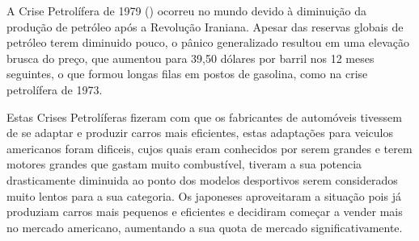 \documentclass[a4paper]{article}
\begin{document}
A Crise Petrolífera de 1979 (\cite{pet79}) ocorreu no mundo devido à diminuição da produção de petróleo após a Revolução Iraniana. 
Apesar das reservas globais de petróleo terem diminuido pouco, o pânico generalizado resultou em uma elevação brusca do preço, 
que aumentou para 39,50 dólares por barril nos 12 meses seguintes, o que formou longas filas em postos de gasolina, como na crise petrolífera de 1973.

Estas Crises Petrolíferas fizeram com que os fabricantes de automóveis tivessem de se adaptar e produzir carros mais eficientes, estas adaptações para 
veiculos americanos foram dificeis, cujos quais eram conhecidos por serem grandes e terem motores grandes que gastam muito combustível,
tiveram a sua potencia drasticamente diminuida ao ponto dos modelos desportivos serem considerados muito lentos para a sua categoria.
Os japoneses aproveitaram a situação pois já produziam carros mais pequenos e eficientes e decidiram começar a vender mais no mercado americano,
aumentando a sua quota de mercado significativamente.

\newpage
\renewcommand{\refname}{Bibliografia} %
\renewcommand{\bibname}{Bibliografia} %
\printbibliography
\end{document}
